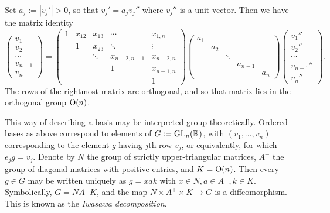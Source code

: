 \documentclass[reqno]{amsart} 
\begin{document}
Set $a_j := |v_j'| > 0$, so that $v_j' = a_j v_j''$ where $v_j''$ is a unit vector.  Then we have the matrix identity
\begin{equation*}
  \begin{pmatrix}
    v_1  \\
    v_2  \\
    \dotsb  \\
    v_{n-1} \\
    v_n
  \end{pmatrix}
  =
  \begin{pmatrix}
    1 & x_{12} & x_{1 3} & \dotsb & x_{1, n} \\
      & 1 & x_{23}  & \ddots & \vdots \\
      &  & \ddots & x_{n-2,n-1} & x_{n-2,n} \\
      &  &  & 1 & x_{n-1, n}\\
      & & & & 1
  \end{pmatrix}
  \begin{pmatrix}
    a_1 &  &  &  &  \\
        & a_2 &  &  &  \\
        &  &   \ddots & & \\
        &  &  & a_{n-1} &  \\
        & & & & a_n
  \end{pmatrix}
  \begin{pmatrix}
    v_1''  \\
    v_2''  \\
    \dotsb  \\
    v_{n-1}''  \\
    v _n ''
  \end{pmatrix}
  .
\end{equation*}
The rows of the rightmost matrix are orthogonal, and so that matrix lies in the orthogonal group $\operatorname{O}(n)$.

This way of describing a basis may be interpreted group-theoretically.  Ordered bases as above correspond to elements of $G := \operatorname{GL}_n (\mathbb{R} )$, with $(v_1,\dotsc,v_n)$ corresponding to the element $g$ having $j$th row $v_j$, or equivalently, for which $e_j g = v_j$.  Denote by $N$ the group of strictly upper-triangular matrices, $A^+$ the group of diagonal matrices with positive entries, and $K = \operatorname{O}(n)$.  Then every $g \in G$ may be written uniquely as $g = x a k$ with $x \in N, a \in A^+, k \in K$.  Symbolically, $G = N A^+ K$, and the map $N \times A^+ \times K \rightarrow G$ is a diffeomorphism.  This is known as the \emph{Iwasawa decomposition}.
\end{document}
